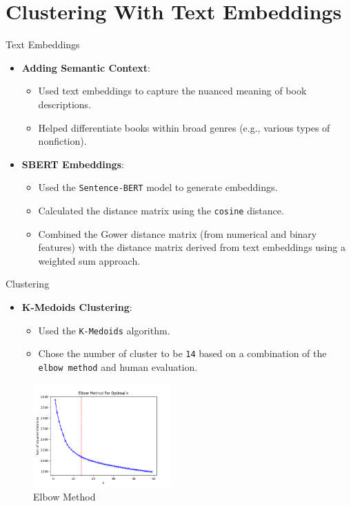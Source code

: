 \documentclass{beamer}
\begin{document}
\section{Clustering With Text Embeddings}
    \begin{frame}{Text Embeddings}
        \begin{itemize}
            \item \textbf{Adding Semantic Context}:
                \begin{itemize}
                    \item Used text embeddings to capture the nuanced meaning of book descriptions.
                    \item Helped differentiate books within broad genres (e.g., various types of nonfiction).
                \end{itemize}
            \item \textbf{SBERT Embeddings}:
                \begin{itemize}
                    \item Used the \texttt{Sentence-BERT} model to generate embeddings.
                    \item Calculated the distance matrix using the \texttt{cosine} distance.
                    \item Combined the Gower distance matrix (from numerical and binary features) with the distance matrix derived from text embeddings using a weighted sum approach.
            \end{itemize}
    \end{itemize}
\end{frame}

\begin{frame}{Clustering}
    \begin{itemize}
        \item \textbf{K-Medoids Clustering}:
            \begin{itemize}
                \item Used the \texttt{K-Medoids} algorithm.
                \item Chose the number of cluster to be \texttt{14} based on a combination of the \texttt{elbow method} and human evaluation.
            \end{itemize}
    \end{itemize}
    \begin{figure}
        \centering
        \includegraphics[width=0.47\textwidth]{../output/elbow_method_0.5.png}
        \caption{Elbow Method}
    \end{figure}
\end{frame}
\end{document}
